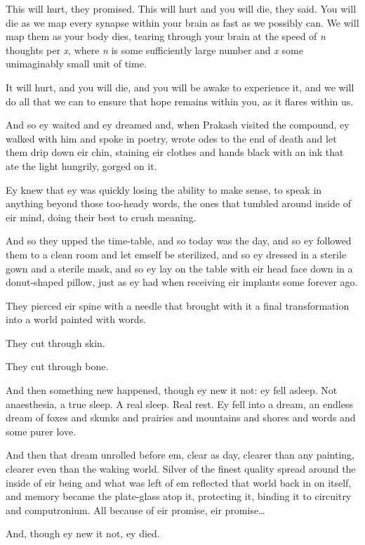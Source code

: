 This will hurt, they promised. This will hurt and you will die, they said. You will die as we map every synapse within your brain as fast as we possibly can. We will map them as your body dies, tearing through your brain at the speed of \emph{n} thoughts per \emph{x}, where \emph{n} is some sufficiently large number and \emph{x} some unimaginably small unit of time.

It will hurt, and you will die, and you will be awake to experience it, and we will do all that we can to ensure that hope remains within you, as it flares within us.

And so ey waited and ey dreamed and, when Prakash visited the compound, ey walked with him and spoke in poetry, wrote odes to the end of death and let them drip down eir chin, staining eir clothes and hands black with an ink that ate the light hungrily, gorged on it.

Ey knew that ey was quickly losing the ability to make sense, to speak in anything beyond those too-heady words, the ones that tumbled around inside of eir mind, doing their best to crush meaning.

And so they upped the time-table, and so today was the day, and so ey followed them to a clean room and let emself be sterilized, and so ey dressed in a sterile gown and a sterile mask, and so ey lay on the table with eir head face down in a donut-shaped pillow, just as ey had when receiving eir implants some forever ago.

They pierced eir spine with a needle that brought with it a final transformation into a world painted with words.

They cut through skin.

They cut through bone.

And then something new happened, though ey new it not: ey fell asleep. Not anaesthesia, a true sleep. A real sleep. Real rest. Ey fell into a dream, an endless dream of foxes and skunks and prairies and mountains and shores and words and some purer love.

And then that dream unrolled before em, clear as day, clearer than any painting, clearer even than the waking world. Silver of the finest quality spread around the inside of eir being and what was left of em reflected that world back in on itself, and memory became the plate-glass atop it, protecting it, binding it to circuitry and computronium. All because of eir promise, eir promise\ldots

And, though ey new it not, ey died.


